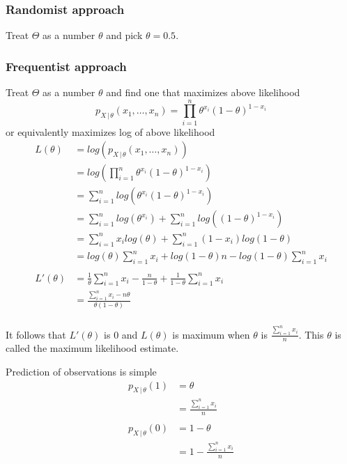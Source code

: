 \documentclass[14pt, reqno]{amsart}
\theoremstyle{definition}
\begin{document}
\subsubsection{Randomist approach} Treat $\Theta$ as a number $\theta$ and pick $\theta = 0.5$.
\vfill
\pagebreak

\subsubsection{Frequentist approach} Treat $\Theta$ as a number $\theta$ and find one that maximizes above likelihood
\vspace{10pt}
$$p_{X \,|\, \theta}(x_1, \dots, x_n) = \prod \limits _{i=1}^n \theta^{x_i} (1 - \theta)^{1 - x_i}$$
\vspace{10pt}
or equivalently maximizes log of above likelihood
\begin{align*}
L(\theta) & = log(p_{X \,|\, \theta}(x_1, \dots, x_n)) \\
& = log(\prod \limits _{i=1}^n \theta^{x_i} (1 - \theta)^{1 - x_i}) \\
& = \sum \limits _{i=1}^n log(\theta^{x_i} (1 - \theta)^{1 - x_i}) \\ & = \sum \limits _{i=1}^n log(\theta^{x_i}) + \sum \limits _{i=1}^n log((1 - \theta)^{1- x_i}) \\
& = \sum \limits _{i=1}^n x_i log(\theta) + \sum \limits _{i=1}^n (1- x_i) log(1 - \theta) \\
 & = log(\theta) \sum \limits _{i=1}^n x_i + log(1 - \theta) n - log(1 - \theta) \sum \limits _{i=1}^n x_i \\
\\
L'(\theta) & = \frac{1}{\theta} \sum \limits _{i=1}^n x_i - \frac{n}{1 - \theta} + \frac{1}{1 - \theta} \sum \limits _{i=1}^n x_i \\
 & = \frac{\sum \limits _{i=1}^n x_i - n \theta}{\theta(1 - \theta)} \\
\end{align*}

It follows that $L'(\theta)$ is $0$ and $L(\theta)$ is maximum when $\theta$ is $\frac{\sum \limits _{i=1}^n x_i}{n}$. This $\theta$ is called the maximum likelihood estimate.
\vfill
\pagebreak

Prediction of observations is simple
\vspace{10pt}
\begin{align*}
p_{X \,|\, \theta}(1) & = \theta \\
 & = \frac{\sum \limits _{i=1}^n x_i}{n} \\
\\
p_{X \,|\, \theta}(0) & = 1 - \theta \\
 & = 1 - \frac{\sum \limits _{i=1}^n x_i}{n}\\
\end{align*}
\vfill
\pagebreak
\end{document}
